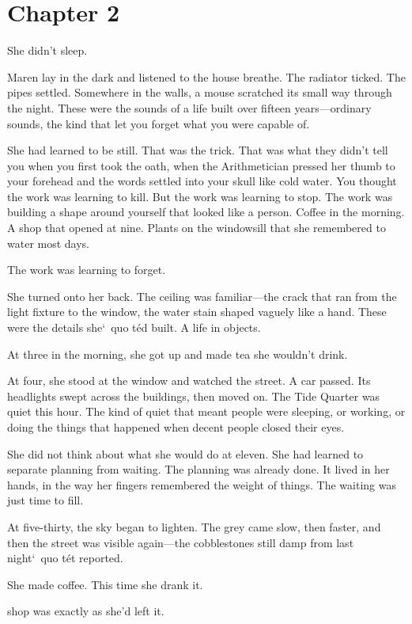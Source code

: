 \documentclass[12pt,letterpaper,openany]{book}
\begin{document}
\chapter{Chapter 2}
She didn't sleep.
\par
Maren lay in the dark and listened to the house breathe. The radiator ticked. The pipes settled. Somewhere in the walls, a mouse scratched its small way through the night. These were the sounds of a life built over fifteen years—ordinary sounds, the kind that let you forget what you were capable of.
\par
She had learned to be still. That was the trick. That was what they didn't tell you when you first took the oath, when the Arithmetician pressed her thumb to your forehead and the words settled into your skull like cold water. You thought the work was learning to kill. But the work was learning to stop. The work was building a shape around yourself that looked like a person. Coffee in the morning. A shop that opened at nine. Plants on the windowsill that she remembered to water most days.
\par
The work was learning to forget.
\par
She turned onto her back. The ceiling was familiar—the crack that ran from the light fixture to the window, the water stain shaped vaguely like a hand. These were the details she`\ quo t\'e{}d built. A life in objects.
\par
At three in the morning, she got up and made tea she wouldn't drink.
\par
At four, she stood at the window and watched the street. A car passed. Its headlights swept across the buildings, then moved on. The Tide Quarter was quiet this hour. The kind of quiet that meant people were sleeping, or working, or doing the things that happened when decent people closed their eyes.
\par
She did not think about what she would do at eleven. She had learned to separate planning from waiting. The planning was already done. It lived in her hands, in the way her fingers remembered the weight of things. The waiting was just time to fill.
\par
At five-thirty, the sky began to lighten. The grey came slow, then faster, and then the street was visible again—the cobblestones still damp from last night`\ quo t\'e{}t reported.
\par
She made coffee. This time she drank it.
\par
\hrulefillThe shop was exactly as she'd left it.
\par
\end{document}
